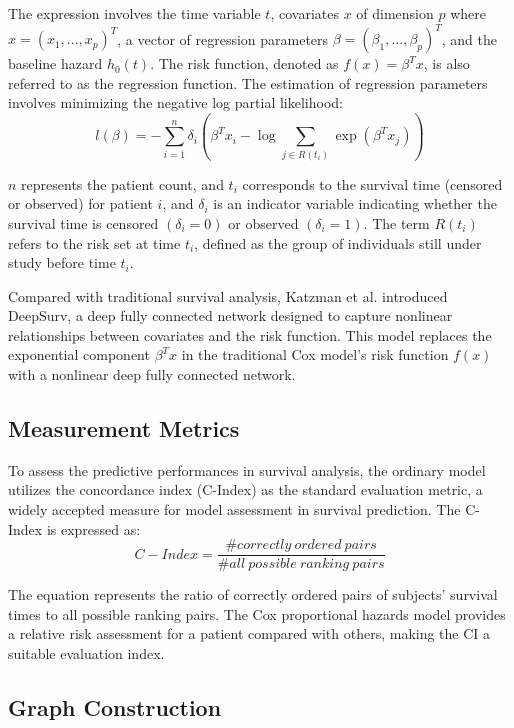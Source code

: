 \documentclass[journal,twoside,web]{ieeecolor}
\begin{document}
The expression involves the time variable $t$, covariates $x$ of dimension $p$ where $x=(x_1,...,x_p)^T$, a vector of regression parameters $\beta=(\beta_1,...,\beta_p)^T$, and the baseline hazard $h_0(t)$. The risk function, denoted as $f(x)=\beta^Tx$, is also referred to as the regression function. The estimation of regression parameters involves minimizing the negative log partial likelihood:
\begin{equation}
    l(\beta) = -\sum_{i=1}^n \delta_i \left( \beta^Tx_i - \log\sum_{j\in R(t_i)} \exp(\beta^Tx_j) \right)
\end{equation}

$n$ represents the patient count, and $t_i$ corresponds to the survival time (censored or observed) for patient $i$, and $\delta_i$ is an indicator variable indicating whether the survival time is censored $(\delta_i=0)$ or observed $(\delta_i=1)$. The term $R(t_i)$ refers to the risk set at time $t_i$, defined as the group of individuals still under study before time $t_i$.

Compared with traditional survival analysis, Katzman et al.\cite{jing2019deep} introduced DeepSurv, a deep fully connected network designed to capture nonlinear relationships between covariates and the risk function. This model replaces the exponential component $\beta^Tx$ in the traditional Cox model's risk function $f(x)$ with a nonlinear deep fully connected network. 

\subsection{Measurement Metrics}
To assess the predictive performances in survival analysis, the ordinary model utilizes the concordance index (C-Index) as the standard evaluation metric, a widely accepted measure for model assessment in survival prediction\cite{steck2007ranking}. 
The C-Index is expressed as:
\begin{equation}
    C-Index=\frac{\#correctly~ordered~pairs}{\#all~possible~ranking~pairs}
\end{equation}

The equation represents the ratio of correctly ordered pairs of subjects' survival times to all possible ranking pairs. 
The Cox proportional hazards model provides a relative risk assessment for a patient compared with others, making the CI a suitable evaluation index.



\subsection{Graph Construction}
\end{document}
